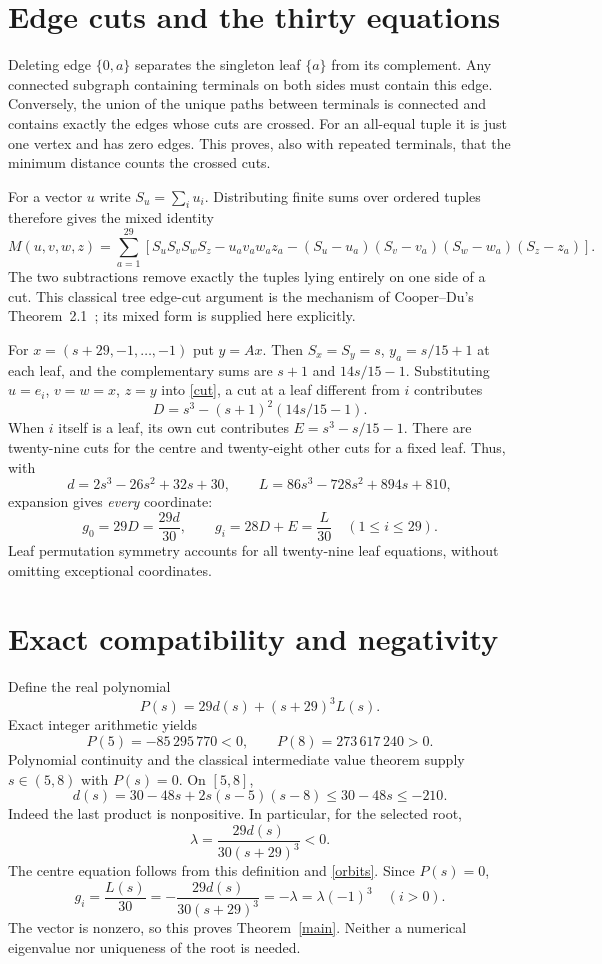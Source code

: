 \documentclass[11pt]{article}
\begin{document}
\section{Edge cuts and the thirty equations}
Deleting edge $\{0,a\}$ separates the singleton leaf $\{a\}$ from its complement. Any connected subgraph containing terminals on both sides must contain this edge. Conversely, the union of the unique paths between terminals is connected and contains exactly the edges whose cuts are crossed. For an all-equal tuple it is just one vertex and has zero edges. This proves, also with repeated terminals, that the minimum distance counts the crossed cuts.

For a vector $u$ write $S_u=\sum_i u_i$. Distributing finite sums over ordered tuples therefore gives the mixed identity
\begin{equation}\label{cut}
 M(u,v,w,z)=\sum_{a=1}^{29}\left[S_uS_vS_wS_z-u_av_aw_az_a
 -(S_u-u_a)(S_v-v_a)(S_w-w_a)(S_z-z_a)\right].
\end{equation}
The two subtractions remove exactly the tuples lying entirely on one side of a cut. This classical tree edge-cut argument is the mechanism of Cooper--Du's Theorem~2.1~\cite{CD}; its mixed form is supplied here explicitly.

For $x=(s+29,-1,\ldots,-1)$ put $y=Ax$. Then $S_x=S_y=s$, $y_a=s/15+1$ at each leaf, and the complementary sums are $s+1$ and $14s/15-1$. Substituting $u=e_i$, $v=w=x$, $z=y$ into \eqref{cut}, a cut at a leaf different from $i$ contributes
\[
 D=s^3-(s+1)^2(14s/15-1).
\]
When $i$ itself is a leaf, its own cut contributes $E=s^3-s/15-1$. There are twenty-nine cuts for the centre and twenty-eight other cuts for a fixed leaf. Thus, with
\[
 d=2s^3-26s^2+32s+30,\qquad
 L=86s^3-728s^2+894s+810,
\]
expansion gives \emph{every} coordinate:
\begin{equation}\label{orbits}
 g_0=29D=\frac{29d}{30},\qquad
 g_i=28D+E=\frac{L}{30}\quad(1\leq i\leq29).
\end{equation}
Leaf permutation symmetry accounts for all twenty-nine leaf equations, without omitting exceptional coordinates.

\section{Exact compatibility and negativity}
Define the real polynomial
\[
 P(s)=29d(s)+(s+29)^3L(s).
\]
Exact integer arithmetic yields
\[
 P(5)=-85\,295\,770<0,\qquad P(8)=273\,617\,240>0.
\]
Polynomial continuity and the classical intermediate value theorem supply $s\in(5,8)$ with $P(s)=0$. On $[5,8]$,
\[
 d(s)=30-48s+2s(s-5)(s-8)\leq30-48s\leq-210.
\]
Indeed the last product is nonpositive. In particular, for the selected root,
\[
 \lambda=\frac{29d(s)}{30(s+29)^3}<0.
\]
The centre equation follows from this definition and \eqref{orbits}. Since $P(s)=0$,
\[
 g_i=\frac{L(s)}{30}=-\frac{29d(s)}{30(s+29)^3}
      =-\lambda=\lambda(-1)^3\quad(i>0).
\]
The vector is nonzero, so this proves Theorem~\ref{main}. Neither a numerical eigenvalue nor uniqueness of the root is needed.
\end{document}
